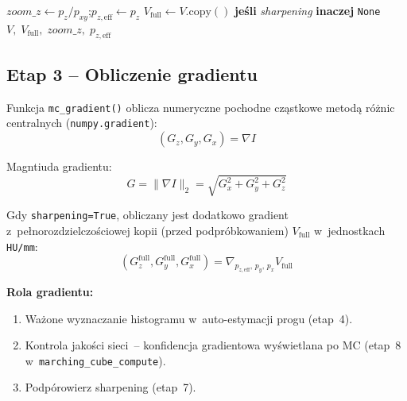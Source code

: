 \documentclass[12pt,a4paper]{article}
\begin{document}
\begin{algorithm}[H]
\caption{\textsc{Preprocess} -- odszumianie, wyrównanie skali Z, anti-aliasing, subsampling}
\label{alg:preproc}
\BlankLine
{}
$\textit{zoom\_z} \leftarrow p_z / p_{xy}$;\quad $p_{z,\text{eff}} \leftarrow p_z$\;
$V_{\text{full}} \leftarrow V.\mathrm{copy}()$ \textbf{jeśli} \emph{sharpening} \textbf{inaczej} \texttt{None}\;
\Return $V,\; V_{\text{full}},\; \textit{zoom\_z},\; p_{z,\text{eff}}$\;
\end{algorithm}

\subsection{Etap 3 -- Obliczenie gradientu}
\label{sec:gradient}

Funkcja \texttt{mc\_gradient()} oblicza numeryczne pochodne cząstkowe metodą
różnic centralnych (\texttt{numpy.gradient}):
\[
  (G_z, G_y, G_x) = \nabla I
\]

Magntiuda gradientu:
\[
  G = \|\nabla I\|_2 = \sqrt{G_x^2 + G_y^2 + G_z^2}
\]

Gdy \texttt{sharpening=True}, obliczany jest dodatkowo gradient z~pełnorozdzielczościowej
kopii (przed podpróbkowaniem) $V_{\text{full}}$ w~jednostkach \texttt{HU/mm}:
\[
  (G_z^{\mathrm{full}}, G_y^{\mathrm{full}}, G_x^{\mathrm{full}}) =
    \nabla_{p_{z,\text{eff}},\, p_y,\, p_x} V_{\text{full}}
\]

\textbf{Rola gradientu:}
\begin{enumerate}
  \item Ważone wyznaczanie histogramu w~auto-estymacji progu (etap~4).
  \item Kontrola jakości sieci~-- konfidencja gradientowa wyświetlana po MC
    (etap~8 w~\texttt{marching\_cube\_compute}).
  \item Podpórowierz sharpening (etap~7).
\end{enumerate}
\end{document}
